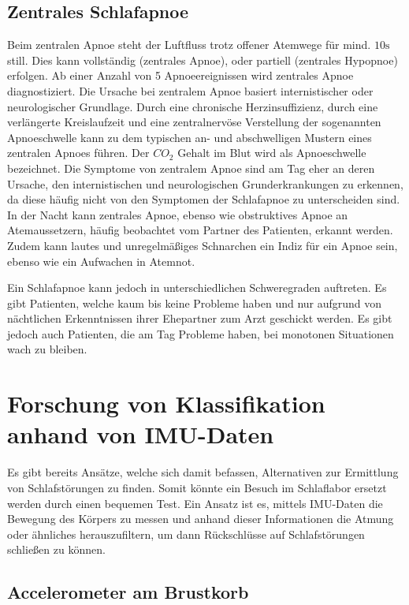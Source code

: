 \subsection{Zentrales Schlafapnoe}
Beim zentralen Apnoe steht der Luftfluss trotz offener Atemwege für mind. $10\si{\s}$ still. Dies kann vollständig (zentrales Apnoe), oder partiell (zentrales Hypopnoe) erfolgen. 
Ab einer Anzahl von 5 Apnoeereignissen wird zentrales Apnoe diagnostiziert.
Die Ursache bei zentralem Apnoe basiert internistischer oder neurologischer Grundlage. 
Durch eine chronische Herzinsuffizienz, durch eine verlängerte Kreislaufzeit und eine zentralnervöse Verstellung der sogenannten Apnoeschwelle kann zu dem typischen an- und abschwelligen Mustern eines zentralen Apnoes führen.
Der $CO_2$ Gehalt im Blut wird als Apnoeschwelle bezeichnet.
Die Symptome von zentralem Apnoe sind am Tag eher an deren Ursache, den internistischen und neurologischen Grunderkrankungen zu erkennen, da diese häufig nicht von den Symptomen der Schlafapnoe zu unterscheiden sind. 
In der Nacht kann zentrales Apnoe, ebenso wie obstruktives Apnoe an Atemaussetzern, häufig beobachtet vom Partner des Patienten, erkannt werden. 
Zudem kann lautes und unregelmäßiges Schnarchen ein Indiz für ein Apnoe sein, ebenso wie ein Aufwachen in Atemnot.

Ein Schlafapnoe kann jedoch in unterschiedlichen Schweregraden auftreten. 
Es gibt Patienten, welche kaum bis keine Probleme haben und nur aufgrund von nächtlichen Erkenntnissen ihrer Ehepartner zum Arzt geschickt werden. 
Es gibt jedoch auch Patienten, die am Tag Probleme haben, bei monotonen Situationen wach zu bleiben.

\section{Forschung von Klassifikation anhand von IMU-Daten}
Es gibt bereits Ansätze, welche sich damit befassen, Alternativen zur Ermittlung von Schlafstörungen zu finden. 
Somit könnte ein Besuch im Schlaflabor ersetzt werden durch einen bequemen Test.
Ein Ansatz ist es, mittels IMU-Daten die Bewegung des Körpers zu messen und anhand dieser Informationen die Atmung oder ähnliches herauszufiltern, um dann Rückschlüsse auf Schlafstörungen schließen zu können.

\subsection{Accelerometer am Brustkorb}

